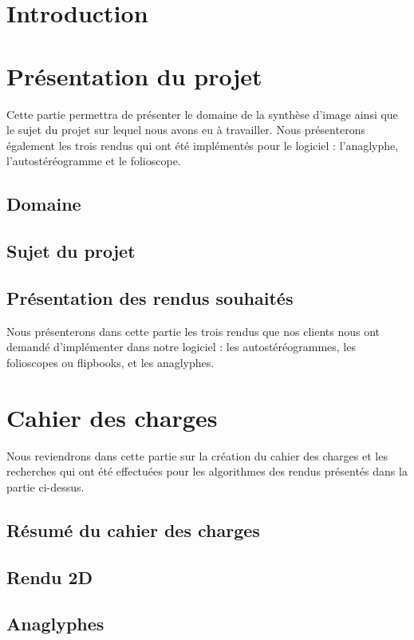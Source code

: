 \documentclass[paper=a4, fontsize=12pt]{article}
\newenvironment{changemargin}[2]{\begin{list}{}{%
      \setlength{\topsep}{0pt}%
      \setlength{\leftmargin}{0pt}%
      \setlength{\rightmargin}{0pt}%
      \setlength{\listparindent}{\parindent}%
      \setlength{\itemindent}{\parindent}%
      \setlength{\parsep}{0pt plus 1pt}%
      \addtolength{\leftmargin}{#1}%
      \addtolength{\rightmargin}{#2}%
    }\item }{\end{list}}
\numberwithin{equation}{section}		%
\numberwithin{figure}{section}			%
\numberwithin{table}{section}				%
\begin{document}
\begin{changemargin}{-1cm}{-1cm}

  \section{Introduction}
  
  \newpage

  \section{Présentation du projet}
  Cette partie permettra de présenter le domaine de la synthèse d'image ainsi que le sujet du projet sur lequel nous avons eu à travailler. Nous présenterons également les trois rendus qui ont été implémentés pour le logiciel : l'anaglyphe, l'autostéréogramme et le folioscope.
  \subsection{Domaine}
  
  \subsection{Sujet du projet}
  
  \subsection{Présentation des rendus souhaités}
  Nous présenterons dans cette partie les trois rendus que nos clients nous ont demandé d'implémenter dans notre logiciel : les autostéréogrammes, les folioscopes ou flipbooks, et les anaglyphes.
  
  \newpage

  \section{Cahier des charges}
  Nous reviendrons dans cette partie sur la création du cahier des charges et les recherches qui ont été effectuées pour les algorithmes des rendus présentés dans la partie ci-dessus.
  \subsection{Résumé du cahier des charges}
  
  \subsection{Rendu 2D}
  
  \subsection{Anaglyphes}
  

\end{changemargin}
\end{document}
